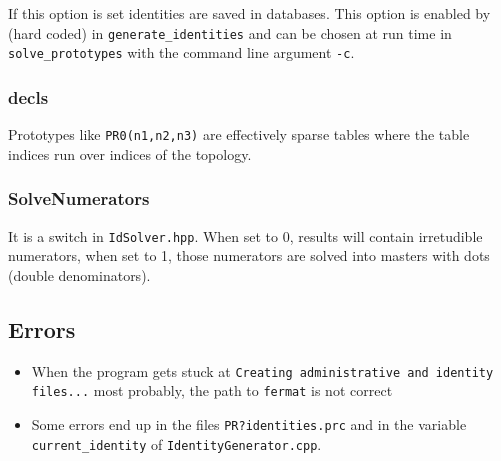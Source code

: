 \documentclass[a4paper,11pt]{article}
\begin{document}
If this option is set identities are saved in databases. This option is enabled
by (hard coded) in \verb+generate_identities+ and can be chosen at run time in 
\verb+solve_prototypes+ with the command line argument \verb+-c+.

\subsubsection*{decls}

Prototypes like \verb+PR0(n1,n2,n3)+ are effectively sparse tables where the
table indices run over indices of the topology.

\subsubsection*{SolveNumerators}

It is a switch in \verb+IdSolver.hpp+. When set to 0, results will contain
irretudible numerators, when set to 1, those numerators are solved into masters
with dots (double denominators).

\subsection*{Errors}

\begin{itemize}
  \item
  When the program gets stuck at
  \verb+Creating administrative and identity files...+
  most probably, the path to \verb+fermat+ is not correct
  \item
  Some errors end up in the files \verb+PR?identities.prc+ and in the variable
  \verb+current_identity+ of \verb+IdentityGenerator.cpp+.

\end{itemize}



\end{document}
